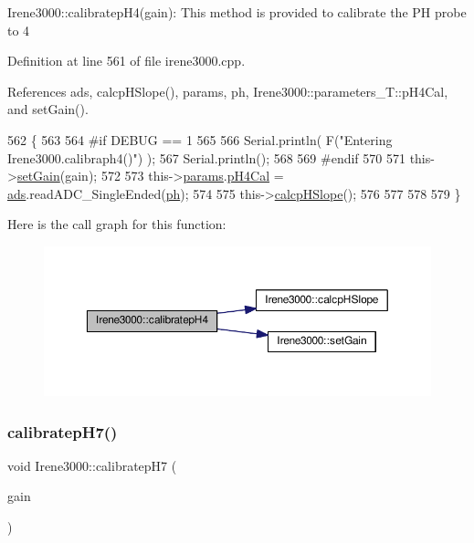 Irene3000\+::calibratep\+H4(gain)\+: This method is provided to calibrate the PH probe to 4 

Definition at line 561 of file irene3000.\+cpp.



References ads, calcp\+H\+Slope(), params, ph, Irene3000\+::parameters\+\_\+\+T\+::p\+H4\+Cal, and set\+Gain().


\begin{DoxyCode}
562 \{
563 
564 \textcolor{preprocessor}{#if DEBUG == 1 }
565 
566     Serial.println( F(\textcolor{stringliteral}{"Entering Irene3000.calibraph4()"}) );
567     Serial.println();
568 
569 \textcolor{preprocessor}{#endif }
570     
571     this->\hyperlink{classIrene3000_aff7c5da186b388e7272e63ff88a20c34}{setGain}(gain);
572 
573     this->\hyperlink{classIrene3000_a136585a5ee7f9ac6ab52175fa153f8e3}{params}.\hyperlink{structIrene3000_1_1parameters__T_a1144de6fb54eb3e1dd2a3d8c2afc97dc}{pH4Cal} =  \hyperlink{classIrene3000_a1215e77ba761c9908d80d691f149e135}{ads}.readADC\_SingleEnded(\hyperlink{Irene3000_8h_af771ceafe0e6524dd8497d4305dfe778}{ph});
574 
575     this->\hyperlink{classIrene3000_a81f6a79e546679692053f7ac1af49613}{calcpHSlope}();
576 
577 
578 
579 \}
\end{DoxyCode}
Here is the call graph for this function\+:
\nopagebreak
\begin{figure}[H]
\begin{center}
\leavevmode
\includegraphics[width=350pt]{classIrene3000_a9772eeea2305fad6236a82e33e93892e_cgraph}
\end{center}
\end{figure}
\mbox{\label{classIrene3000_a2e810ddfa8b95eaa2446a408761c6bdc}} 
\subsubsection{\texorpdfstring{calibratep\+H7()}{calibratepH7()}}
{\footnotesize\ttfamily void Irene3000\+::calibratep\+H7 (\begin{DoxyParamCaption}\item[{ads\+Gain\+\_\+t}]{gain }\end{DoxyParamCaption})}

